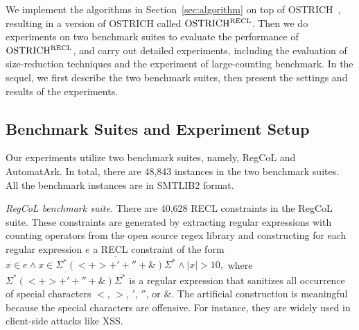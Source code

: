 %

We implement the algorithms in Section~\ref{sec:algorithm} on top of OSTRICH~\cite{Ostrich,atva2020}, resulting in a version of OSTRICH called $\rm OSTRICH^{RECL}$.
Then we do experiments on two benchmark suites to evaluate the performance of $\rm OSTRICH^{RECL}$, and carry out detailed experiments, including the evaluation of size-reduction techniques and the experiment of large-counting benchmark. In the sequel, we first describe the two benchmark suites, then present the settings and results of the experiments.


\vspace{-3mm}
\subsection{Benchmark Suites and Experiment Setup}\label{sec:bench}
\vspace{-2mm}

Our experiments utilize two benchmark suites, namely, RegCoL and AutomatArk. In total, there are 48,843 instances in the two benchmark suites. All the benchmark instances are in SMTLIB2 format.

\medskip
\noindent
\emph{RegCoL benchmark suite.} There are 40,628 RECL constraints in the RegCoL suite. These constraints are generated by extracting regular expressions with counting operators from the open source regex library \cite{regex_lingua_franca,redos_lenka} and constructing for each regular expression $e$ a RECL constraint of the form
$x \in e \wedge x \in \overline{\Sigma^*(<+ >+'+''+\&)\Sigma^*} \wedge |x| > 10,$
where $\overline{\Sigma^*(<+ >+'+''+\&)\Sigma^*}$ is a regular expression that sanitizes all occurrence of special characters $<$, $>$, $'$, $''$, or $\&$. The artificial construction is meaningful because the special characters are offensive. For instance, they are widely used in client-side attacks like XSS\cite{malware_detection_3_kudzu}\cite{CCH+18}.

